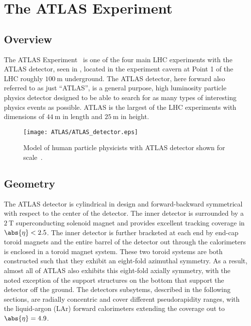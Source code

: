 \chapter{The ATLAS Experiment}\label{chapter:ATLAS}

\section{Overview}\label{sec:ATLAS_overview}

The ATLAS Experiment~\cite{PERF-2007-01} is one of the four main LHC experiments with the ATLAS detector, seen in , located in the experiment cavern at Point 1 of the LHC roughly $100~\textrm{m}$ underground.
The ATLAS detector, here forward also referred to as just ``ATLAS'', is a general purpose, high luminosity particle physics detector designed to be able to search for as many types of interesting physics events as possible.
ATLAS is the largest of the LHC experiments with dimensions of $44~\mathrm{m}$ in length and $25~\mathrm{m}$ in height.

\begin{figure}[htbp]
 \centering
 \texttt{[image: ATLAS/ATLAS\_detector.eps]}
 \caption[Cut-away view of the ATLAS detector.]{%
  Model of human particle physicists with ATLAS detector shown for scale~\cite{Pequenao:1095924}.}\label{fig:ATLAS_detector}
\end{figure}

\section{Geometry}\label{sec:ATLAS_geometry}

The ATLAS detector is cylindrical in design and forward-backward symmetrical with respect to the center of the detector.
The inner detector is surrounded by a $2~\mathrm{T}$ superconducting solenoid magnet and provides excellent tracking coverage in $\abs{\eta} < 2.5$.
The inner detector is further bracketed at each end by end-cap toroid magnets and the entire barrel of the detector out through the calorimeters is enclosed in a toroid magnet system.
These two toroid systems are both constructed such that they exhibit an eight-fold azimuthal symmetry.
As a result, almost all of ATLAS also exhibits this eight-fold axially symmetry, with the noted exception of the support structures on the bottom that support the detector off the ground.
The detectors subsytems, described in the following sections, are radially concentric and cover different pseudorapidity ranges, with the liquid-argon (LAr) forward calorimeters extending the coverage out to $\abs{\eta} = 4.9$.

